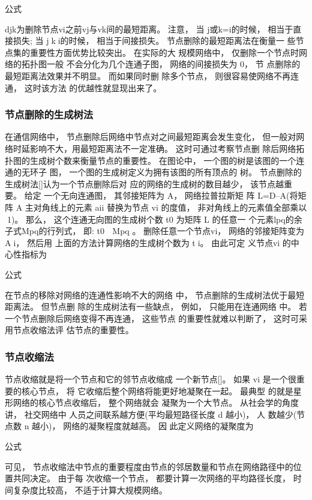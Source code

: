				公式

				djk为删除节点vi之前vj与vk间的最短距离。 注意， 当 j或k=i的时候， 相当于直接损失; 当 jki的时候， 相当于间接损失。 节点删除的最短距离法在衡量一 些节点集的重要性方面优势比较突出。 在实际的大 规模网络中， 仅删除一个节点时网络的拓扑图一般 不会分化为几个连通子图， 网络的间接损失为 0， 节 点删除的最短距离法效果并不明显。 而如果同时删 除多个节点， 则很容易使网络不再连通， 这时该方法 的优越性就显现出来了。

	\subsubsection{节点删除的生成树法}
	在通信网络中， 节点删除后网络中节点对之间最短距离会发生变化， 但一般对网络时延影响不大，用最短距离法不一定准确。 这时可通过考察节点删 除后网络拓扑图的生成树个数来衡量节点的重要性。 在图论中， 一个图的树是该图的一个连通的无环子 图， 一个图的生成树定义为拥有该图的所有顶点的 树。 节点删除的生成树法[]认为一个节点删除后对 应的网络的生成树的数目越少， 该节点越重要。 给定 一个无向连通图， 其邻接矩阵为 A， 网络拉普拉斯矩 阵 L=D–A(将矩阵 A 主对角线上的元素 aii 替换为节点 vi 的度值， 非对角线上的元素值全部乘以1)。 那么， 这个连通无向图的生成树个数 t0 为矩阵 L 的任意一 个元素lpq的余子式Mpq的行列式， 即: t0  Mpq 。 删除任意一个节点vi， 网络的邻接矩阵变为Ai， 然后用 上面的方法计算网络的生成树个数为 ti。 由此可定 义节点vi 的中心性指标为

				公式

				在节点的移除对网络的连通性影响不大的网络 中， 节点删除的生成树法优于最短距离法。 但节点删 除的生成树法有一些缺点， 例如， 只能用在连通网络 中。 若一个节点删除后网络变得不再连通， 这些节点 的重要性就难以判断了， 这时可采用节点收缩法评 估节点的重要性。
	\subsubsection{节点收缩法}
	节点收缩就是将一个节点和它的邻节点收缩成 一个新节点[]。 如果 vi 是一个很重要的核心节点， 将 它收缩后整个网络将能更好地凝聚在一起。 最典型 的就是星形网络的核心节点收缩后， 整个网络就会 凝聚为一个大节点。 从社会学的角度讲， 社交网络中 人员之间联系越方便(平均最短路径长度 d 越小)， 人 数越少(节点数 n 越小)， 网络的凝聚程度就越高。 因 此定义网络的凝聚度为

				公式

				可见， 节点收缩法中节点的重要程度由节点的邻居数量和节点在网络路径中的位置共同决定。 由于每 次收缩一个节点， 都要计算一次网络的平均路径长度， 时间复杂度比较高， 不适于计算大规模网络。

